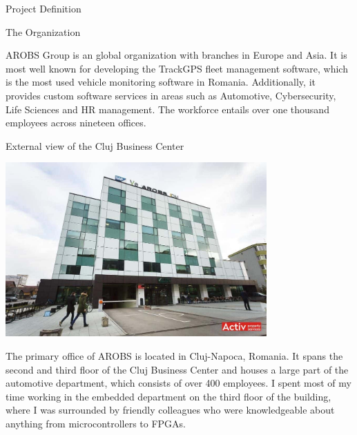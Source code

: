 \documentclass{matthijs}
\begin{document}
	\begin{hoofdstuk}{Project Definition}

		\setlength\parindent{1.5em}
		\setlength{\parskip}{0.5em plus 0.2em minus 0.1em}
		\linespread{1.2}
		\vspace{-2.5ex}
		\begin{paragraaf}{The Organization}

			AROBS Group is an global organization with branches in Europe and Asia.
			It is most well known for developing the TrackGPS fleet management software, which is the most used vehicle monitoring software in Romania.
			Additionally, it provides custom software services in areas such as Automotive, Cybersecurity, Life Sciences and HR management.
			The workforce entails over one thousand employees across nineteen offices.

			\vspace{0.3ex}
			\begin{figuur}{External view of the Cluj Business Center}

				\includegraphics[width=0.75\textwidth, clip, trim=0cm 2cm 0cm 0cm]{cbc.jpg}

			\end{figuur}
			\vspace{-0.2ex}

			\noindent The primary office of AROBS is located in Cluj-Napoca, Romania. 
			It spans the second and third floor of the Cluj Business Center and houses a large part of the automotive department, which consists of over 400 employees.	
			I spent most of my time working in the embedded department on the third floor of the building, where I was surrounded by friendly colleagues who were knowledgeable about anything from microcontrollers to FPGAs.
			

\end{paragraaf}
\end{hoofdstuk}
\end{document}
